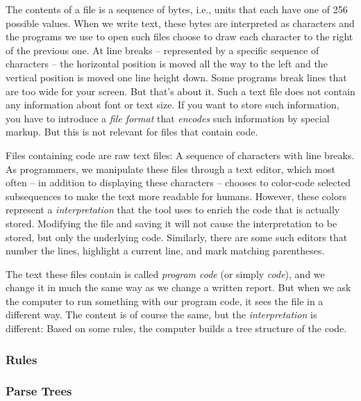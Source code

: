 The contents of a file is a sequence of bytes, i.e., units that each have one of 256 possible values. When we write text, these bytes are interpreted as characters and the programs we use to open such files choose to draw each character to the right of the previous one. At line breaks -- represented by a specific sequence of characters -- the horizontal position is moved all the way to the left and the vertical position is moved one line height down. Some programs break lines that are too wide for your screen. But that's about it. Such a text file does not contain any information about font or text size. If you want to store such information, you have to introduce a \textsl{file format} that \textsl{encodes} such information by special markup. But this is not relevant for files that contain code.

Files containing code are raw text files: A sequence of characters with line breaks. As programmers, we manipulate these files through a text editor, which most often -- in addition to displaying these characters -- chooses to color-code selected subsequences to make the text more readable for humans. However, these colors represent a \textsl{interpretation} that the tool uses to enrich the code that is actually stored. Modifying the file and saving it will not cause the interpretation to be stored, but only the underlying code. Similarly, there are some such editors that number the lines, highlight a current line, and mark matching parentheses.

The text these files contain is called \textsl{program code} (or simply \textsl{code}), and we change it in much the same way as we change a written report. But when we ask the computer to run something with our program code, it sees the file in a different way. The content is of course the same, but the \textsl{interpretation} is different: Based on some rules, the computer builds a tree structure of the code.


\subsubsection{Rules}


\subsubsection{Parse Trees}

